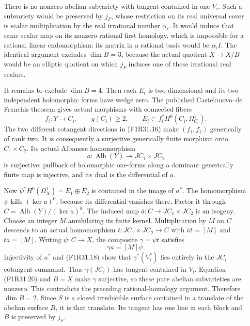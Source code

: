 There is no nonzero abelian subvariety
with tangent contained in one $V_i$.
Such a subvariety would be preserved by
$j_F$, whose restriction on its real
universal cover is scalar multiplication
by the real irrational number $\alpha_i$.
It would induce that same scalar map on
its nonzero rational first homology,
which is impossible for a rational
linear endomorphism: its matrix in a
rational basis would be $\alpha_i I$.
The identical argument excludes
$\dim B=3$, because the actual quotient
$X\to X/B$ would be an elliptic quotient
on which $j_F$ induces one of these
irrational real scalars.

It remains to exclude $\dim B=4$.
Then each $E_i$ is two dimensional and
its two independent holomorphic forms
have wedge zero. The published
Castelnuovo--de Franchis theorem gives
actual morphisms with connected fibers
\[
                 f_i:Y\longrightarrow C_i,
                 \qquad g(C_i)\ge2,\qquad
                 E_i\subset f_i^*H^0(C_i,\Omega_{C_i}^1).
 \tag{F1R31.18}
\]
The two different cotangent directions
in (F1R31.16) make $(f_1,f_2)$ generically
of rank two. It is consequently a
surjective generically finite morphism
onto $C_1\times C_2$. Its actual
Albanese homomorphism
\[
          a:\operatorname{Alb}(Y)\twoheadrightarrow
                            JC_1\times JC_2
 \tag{F1R31.19}
\]
is surjective: pullback of holomorphic
one-forms along a dominant generically
finite map is injective, and its dual
is the differential of $a$.

Now $\psi^*H^0(\Omega_X^1)=E_1\oplus E_2$
is contained in the image of $a^*$.
The homomorphism $\psi$ kills
$(\ker a)^0$, because its differential
vanishes there. Factor it through
$C=\operatorname{Alb}(Y)/(\ker a)^0$.
The induced map $\bar a:C\to JC_1\times JC_2$
is an isogeny. Choose an integer $M$
annihilating its finite kernel. Multiplication
by $M$ on $C$ descends to an actual
homomorphism $t:JC_1\times JC_2\to C$
with $\bar a t=[M]$ and $t\bar a=[M]$.
Writing $\bar\psi:C\to X$, the composite
$\gamma=\bar\psi t$ satisfies
\[
                              \gamma a=[M]\psi.
 \tag{F1R31.20}
\]
Injectivity of $a^*$ and (F1R31.18)
show that $\gamma^*(V_i^*)$ lies entirely
in the $JC_i$ cotangent summand. Thus
$\gamma(JC_i)$ has tangent contained in
$V_i$. Equation (F1R31.20) and $B=X$
make $\gamma$ surjective, so these pure
abelian subvarieties are nonzero. This
contradicts the preceding rational-homology
argument. Therefore $\dim B=2$.
Since $S$ is a closed irreducible surface
contained in a translate of the abelian
surface $B$, it is that translate.
Its tangent has one line in each block
and $B$ is preserved by $j_F$.

